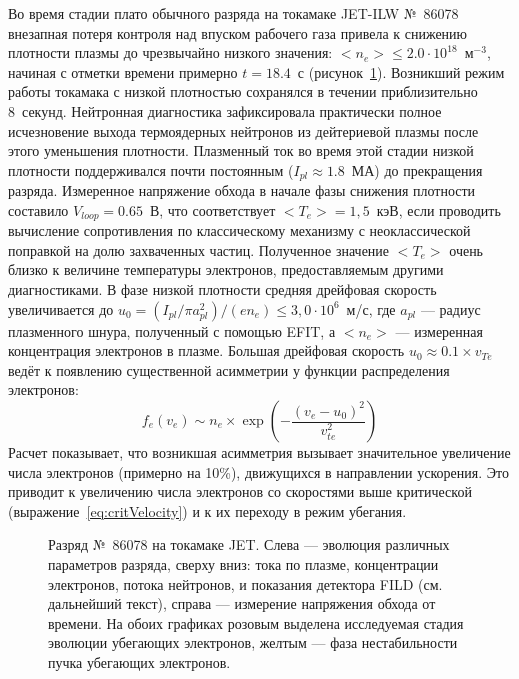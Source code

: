 Во время стадии плато обычного разряда на токамаке JET-ILW №~86078 внезапная потеря контроля над впуском рабочего газа привела к снижению плотности плазмы до чрезвычайно низкого значения: $ <n_e> \le 2.0\cdot10^{18}$~м${}^{-3}$, начиная с отметки времени примерно $t = 18.4$~с (рисунок~\ref{fig:jetPulseParams86078}). Возникший режим работы токамака с низкой плотностью сохранялся в течении приблизительно 8~секунд. Нейтронная диагностика зафиксировала практически полное исчезновение выхода термоядерных нейтронов из дейтериевой плазмы после этого уменьшения плотности. Плазменный ток во время этой стадии низкой плотности поддерживался почти постоянным ($I_{pl} \approx 1.8$~МА) до прекращения разряда. Измеренное напряжение обхода в начале фазы снижения плотности составило $V_{loop} = 0.65$~В, что соответствует $<T_e> = 1,5$~кэВ, если проводить вычисление сопротивления по классическому механизму с неоклассической поправкой на долю захваченных частиц. Полученное значение $<T_e>$ очень близко к величине температуры электронов, предоставляемым другими диагностиками. В фазе низкой плотности средняя дрейфовая скорость увеличивается до $u_0 = (I_{pl}/\pi a_{pl}^2 )/(e n_e) \le 3,0\cdot10^6$~м/с, где $a_{pl}$ --- радиус плазменного шнура, полученный с помощью EFIT, а $<n_e>$ --- измеренная концентрация электронов в плазме. Большая дрейфовая скорость $u_0 \approx 0.1 \times v_{Te}$ ведёт к появлению существенной асимметрии у  функции распределения электронов:
\begin{equation*}
  f_e(v_e) \sim n_e \times \exp \left( -\frac{ ( v_e - u_0 )^2 }{ v_{te}^2 } \right)
\end{equation*}
Расчет показывает, что возникшая асимметрия вызывает значительное увеличение числа электронов (примерно на 10\%), движущихся в направлении ускорения. Это приводит к увеличению числа электронов со скоростями выше критической (выражение~\ref{eq:critVelocity}) и к их переходу в режим убегания.~\cite{Plyusnin2015}

\begin{figure}[ht!]
  \caption{ Разряд №~86078 на токамаке JET. Слева --- эволюция различных параметров разряда, сверху вниз: тока по плазме, концентрации электронов, потока нейтронов, и показания детектора FILD (см. дальнейший текст), справа --- измерение напряжения обхода от времени. На обоих графиках розовым  выделена исследуемая стадия эволюции убегающих электронов, желтым --- фаза нестабильности пучка убегающих электронов.~\cite{Plyusnin2015} }
  \label{fig:jetPulseParams86078}
\end{figure}

